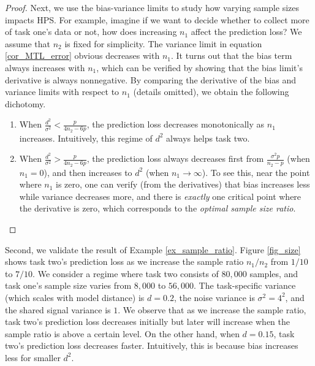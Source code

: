 \begin{proof}
Next, we use the bias-variance limits to study how varying sample sizes impacts HPS.
For example, imagine if we want to decide whether to collect more of task one's data or not, how does increasing $n_1$ affect the prediction loss?
We assume that $n_2$ is fixed for simplicity.
The variance limit in equation \eqref{cor_MTL_error} obvious decreases with $n_1$.
It turns out that the bias term always increases with $n_1$, which can be verified by showing that the bias limit's derivative is always nonnegative.
By comparing the derivative of the bias and variance limits with respect to $n_1$ (details omitted), we obtain the following dichotomy.
\begin{enumerate}
	\item When $\frac{d^2}{\sigma^2} < \frac{p}{4n_2 - 6p}$, the prediction loss decreases monotonically as $n_1$ increases.
	Intuitively, this regime of $d^2$ always helps task two.
	\item When $\frac{d^2}{\sigma^2} > \frac{p}{4n_2 - 6p}$, the prediction loss always decreases first from $\frac{\sigma^2 p}{n_2 - p}$ (when $n_1 = 0$), and then increases to $d^2$ (when $n_1 \rightarrow \infty$).
	To see this, near the point where $n_1$ is zero, one can verify (from the derivatives) that bias increases less while variance decreases more, and there is \textit{exactly} one critical point where the derivative is zero, which corresponds to the \textit{optimal sample size ratio}.
\end{enumerate}
\fi
\end{proof}


Second, we validate the result of Example \ref{ex_sample_ratio}.
Figure \ref{fig_size} shows task two's prediction loss  as we increase the sample ratio $n_1 / n_2$ from $1/10$ to $7/10$.
We consider a regime where task two consists of $80,000$ samples, and task one's sample size varies from $8,000$ to $56,000$.
The task-specific variance (which scales with model distance) is $d = 0.2$, the noise variance is $\sigma^2 = 4^2$, and the shared signal variance is $1$. We observe that as we increase the sample ratio, task two's prediction loss decreases initially but later will increase when the sample ratio is above a certain level.
On the other hand, when $d = 0.15$, task two's prediction loss decreases faster.
Intuitively, this is because bias increases less for smaller $d^2$.





